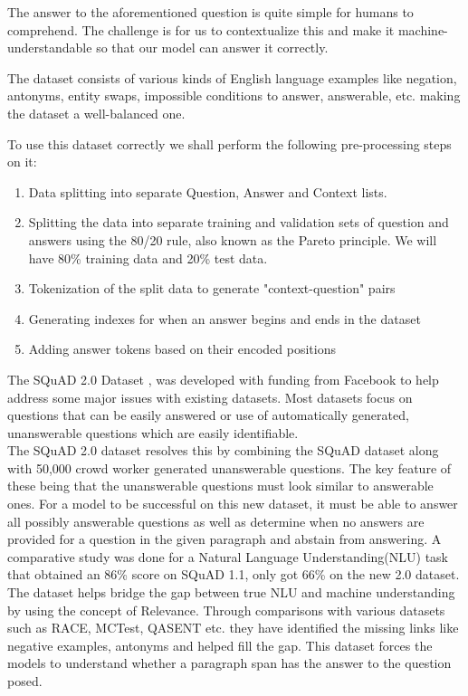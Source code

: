 \documentclass[12pt]{report}
\begin{document}
    The answer to the aforementioned question is quite simple for humans to comprehend. The challenge is for us to contextualize this and make it machine-understandable so that our model can answer it correctly.

    The dataset consists of various kinds of English language examples like negation, antonyms, entity swaps, impossible conditions to answer, answerable, etc. making the dataset a well-balanced one.

    To use this dataset correctly we shall perform the following pre-processing steps on it:

    \begin{enumerate}
    	\item Data splitting into separate Question, Answer and Context lists.
    	\item Splitting the data into separate training and validation sets of  question and answers using the 80/20 rule, also known as the Pareto principle. We will have 80\% training data and 20\% test data.
    	\item Tokenization of the split data to generate "context-question" pairs
    	\item Generating indexes for when an answer begins and ends in the dataset
    	\item Adding answer tokens based on their encoded positions
    \end{enumerate}

        The SQuAD 2.0 Dataset \citep{dataset}, was developed with funding from Facebook to help address some major issues with existing datasets. Most datasets focus on questions that can be easily answered or use of    automatically generated, unanswerable questions which are easily identifiable.\\
        The SQuAD 2.0 dataset resolves this by combining the SQuAD dataset along with 50,000 crowd worker generated unanswerable questions. The key feature of these being that the unanswerable questions must look similar to answerable ones. For a model to be successful on this new dataset, it must be able to answer all possibly answerable questions as well as determine when no answers are provided for a question in the given paragraph and abstain from answering. A comparative study was done for a Natural Language Understanding(NLU) task that obtained an 86\% score on SQuAD 1.1, only got 66\% on the new 2.0 dataset.
        The dataset helps bridge the gap between true NLU and machine understanding by using the concept of Relevance. Through comparisons with various datasets such as RACE, MCTest, QASENT etc. they have identified the missing links like negative examples, antonyms and helped fill the gap. This dataset forces the models to understand whether a paragraph span has the answer to the question posed.
\end{document}
